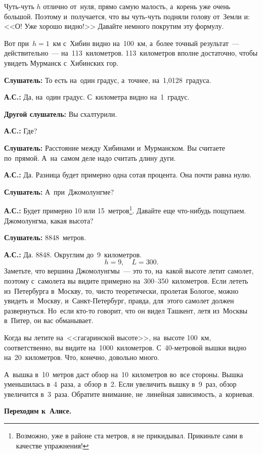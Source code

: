 Чуть-чуть $h$ отлично от~нуля, прямо самую малость, а~корень уже очень большой. Поэтому и~получается,
что вы чуть-чуть подняли голову от~Земли и: <<О! Уже хорошо видно!>> Давайте немного покрутим эту
формулу.

Вот при~$h=1$~км с~Хибин видно на~100~км, а~более точный результат~--- действительно~--- на~113~километров.
113~километров вполне достаточно, чтобы увидеть Мурманск с~Хибинских гор.

\textbf{Слушатель:} То есть на~один градус, а~точнее, на~1,0128~гра\-дуса.

\textbf{А.С.:} Да, на~один градус. С~километра видно на~1~градус.

\textbf{Другой слушатель:} Вы схалтурили.

\textbf{А.С.:} Где?

\textbf{Слушатель:} Расстояние между Хибинами и~Мурманском. Вы считаете по~прямой. А~на~самом деле надо
считать длину дуги.

\textbf{А.С.:} Да. Разница будет примерно одна сотая процента. Она почти равна нулю.

\textbf{Слушатель:} А~при~Джомолунгме?

\textbf{А.С.:} Будет примерно 10 или 15~метров\footnote{Возможно, уже в районе ста метров, я не прикидывал. Прикиньте сами в качестве упражнения!}.
Давайте еще что-нибудь пощупаем. Джомолунгма, какая высота?

\textbf{Слушатель:} 8848~метров.

\textbf{А.С.:} Да. 8848. Округлим до~9~километров.
$$
h=9,\quad
L=300.
$$
Заметьте, что вершина Джомолунгмы~--- это то, на~какой высоте летит самолет, поэтому с~самолета вы
видите примерно на~300--350~километров. Если лететь из~Петербурга в~Москву, то, чисто теоретически,
пролетая Бологое, можно увидеть и~Москву, и~Санкт-Петербург, правда, для~этого самолет должен
развернуться. Но~если кто-то говорит, что он видел Ташкент, летя из~Москвы в~Питер, он вас
обманывает.

\pagebreak

Когда вы летите на~<<гагаринской высоте>>, на~высоте 100~км, соответственно, вы видите на~1000~километров.
С~40-метровой вышки видно на~20~километров. Что, конечно, довольно много.

А~вышка в~10~метров даст обзор на~10~километров во~все стороны. Вышка уменьшилась в~4~раза, а~обзор
в~2. Если увеличить вышку в~9~раз, обзор увеличится в~3~раза. Обратите внимание, не~линейная
зависимость, а~корневая.

\textbf{Переходим к~Алисе.}

